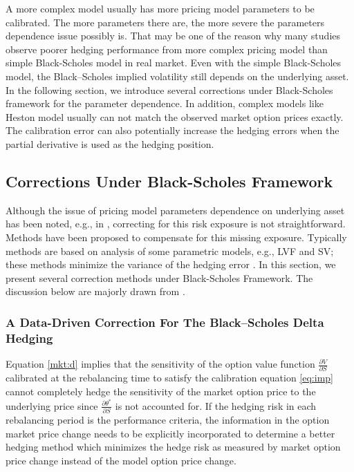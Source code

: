 \documentclass[letterpaper,12pt,titlepage,oneside,final]{book}
\numberwithin{equation}{section}
\theoremstyle{definition}
\begin{document}
A more complex model usually has more pricing model parameters to be calibrated. The more parameters there are, the more severe the parameters dependence issue possibly is. That may be one of the reason why many studies observe poorer hedging performance from more complex pricing model than simple Black-Scholes model in real market. Even with the simple Black-Scholes model, the Black–Scholes implied volatility still depends on the underlying asset. In the following section, we introduce several corrections under Black-Scholes framework for the parameter dependence. In addition, complex models like Heston model usually can not match the observed market option prices exactly. The calibration error can also potentially increase the hedging errors when the partial derivative is used as the hedging position.  



\subsection{Corrections Under Black-Scholes Framework}
Although the issue of pricing model parameters dependence on underlying asset has been noted, e.g., in \citep{coleman2001,hulloptimal}, correcting for this risk exposure is not straightforward.
Methods have been proposed to compensate for this missing exposure.  Typically methods are based on analysis of some parametric models, e.g., LVF and SV; these methods minimize the variance of the hedging error \citep{hulloptimal,alexander09,Angelini09,Angelini10,Goutte13}. In this section, we present several correction methods under Black-Scholes Framework. The discussion below are majorly drawn from \cite{hulloptimal,hagan2017bartlett,bartlett2006hedging}.
\subsubsection{A Data-Driven Correction For The Black–Scholes Delta Hedging}




Equation \eqref{mkt:d} implies that the sensitivity of the option value function $\frac{\partial V}{\partial S}$ calibrated at the rebalancing time to
satisfy the calibration equation \eqref{eq:imp} cannot completely hedge  
the sensitivity of the market option price to the underlying price since $\frac{\partial \theta^*}{\partial S}$ is not accounted for.
If the hedging risk in each rebalancing period is the performance criteria, the information in the option market price change needs to be explicitly incorporated to determine a better hedging method which minimizes the hedge risk as measured by
market option price change instead of the model option price change.
\end{document}
